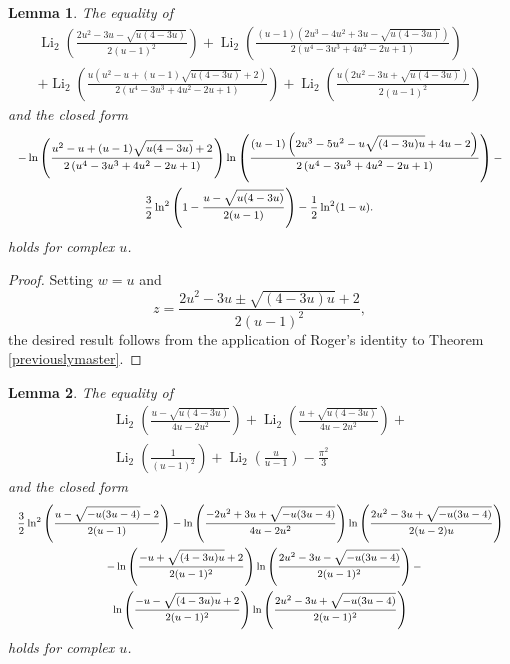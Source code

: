 \documentclass[12pt]{article}
\newtheorem{lemma}{Lemma}%
\begin{document}
\begin{lemma}\label{previously10p2}
 The equality of 
\begin{multline*}
 \operatorname{Li}_2 \left( \frac{2 u^2 - 3 u - \sqrt{u(4-3u)}}{2 (u-1)^2} \right) 
 + \operatorname{Li}_2 \left( \frac{(u - 1) \left(2 u^3 - 4 u^2 + 3 u - \sqrt{u(4 - 
 3 u)} \right)}{2 \left(u^4 - 3 u^3 + 4 u^2 - 2 u + 1\right)} \right) \\ 
 + \operatorname{Li}_2 \left( \frac{u \left( u^2 - u + (u - 1) \sqrt{u(4-3u)} + 
 2 \right)}{2 \left(u^4 - 3 u^3 + 4 u^2 - 2 u + 1\right)} \right) 
 + \operatorname{Li}_2 \left( \frac{u \left(2 u^2 - 3 u + \sqrt{u(4-3u)}\right)}{2 (u-1)^2} \right) 
\end{multline*}
 and the closed form 
\begin{multline*}
 \text{ { \footnotesize $ - \ln \left( \frac{u^2 - u + (u - 
 1) \sqrt{u(4 - 3 u)} + 2}{2 \left(u^4 - 3 u^3 + 4 u^2 - 2 u + 1\right)} \right) 
 \ln \left( \frac{(u - 1) \left(2 u^3 - 5 u^2 - u \sqrt{(4 - 3 u) u} + 4 u - 2\right)}{2 \left(u^4 - 3 u^3 + 
 4 u^2 - 2 u + 1\right)} \right) - $ } } \\ 
 \text{ { \footnotesize $ \frac{3}{2} \ln^2 \left( 1 - \frac{u - \sqrt{u(4-3u)}}{2(u-1)} \right) - 
 \frac{1}{2} \ln^2 (1 - u)$. } }
\end{multline*}
 holds for complex $u$. 
\end{lemma}

\begin{proof}
 Setting $w = u$ and $$ z = \frac{2u^2-3u \pm \sqrt{(4 - 3u)u} + 2}{2(u-1)^2}, $$ the desired result follows from the application 
 of Roger's identity to Theorem \ref{previouslymaster}. 
\end{proof}

\begin{lemma}\label{previously10p3}
 The equality of 
\begin{multline*}
 \operatorname{Li}_2\left(\frac{u - \sqrt{u(4 - 3u)}}{4u - 2u^2}\right) + 
 \operatorname{Li}_2\left(\frac{u + \sqrt{u(4 - 3u)}}{4u - 2u^2}\right) + \\ 
 \operatorname{Li}_2\left(\frac{1}{(u - 1)^2}\right) + \operatorname{Li}_2\left(\frac{u}{u - 1}\right) - \frac{\pi^2}{3} 
\end{multline*}
 and the closed form 
\begin{multline*}
 \text{ { \footnotesize $ \frac{3}{2} \ln^2 \left(\frac{u - \sqrt{-u (3 u - 4)} - 2}{2 (u - 1)}\right) 
 - \ln \left(\frac{-2 u^2 + 3 u + \sqrt{-u (3 u - 4)}}{4 u - 2 u^2}\right) \ln \left(\frac{2 
 u^2 - 3 u + \sqrt{-u (3 u - 4)}}{2 (u - 2) u}\right) $ } } \\ 
 \text{ { \footnotesize $ - \ln \left(\frac{-u + \sqrt{(4-3 u) u} + 2}{2 (u - 
 1)^2}\right) \ln \left(\frac{2 u^2 - 3 u - \sqrt{-u (3u-4)}}{2(u-1)^2}\right) - $}} \\ 
 \text{ { \footnotesize $ \ln \left(\frac{-u - \sqrt{(4 - 3 u) u} + 2}{2 (u - 1)^2}\right) \ln \left(\frac{2 
 u^2 - 3 u + \sqrt{-u (3 u - 4)}}{2(u-1)^2}\right)$ } }
\end{multline*}
 holds for complex $u$. 
\end{lemma}
\end{document}
